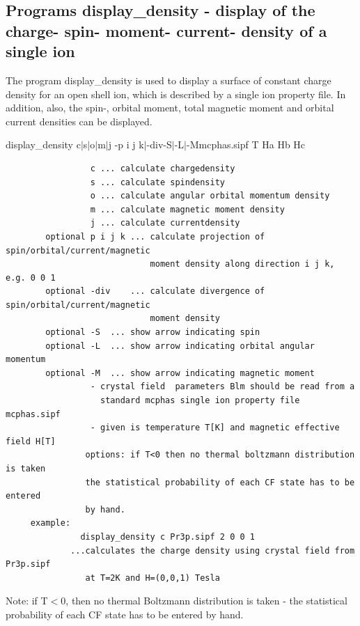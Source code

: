 \subsection{Programs {\prg display\_density} 
- display of the charge- spin- moment- current- density of a single ion}\label{displaydensity}

The program {\prg display\_density} is used to display a surface of constant
charge density for an open shell ion, which is described by a single ion property file.
In addition, also, the spin-, orbital moment, total magnetic moment and orbital current
densities can be displayed. 


\begin{description} 
\item [ display\_density  c$|$s$|$o$|$m$|$j \lbrack -p i j k$|$-div\rbrack \lbrack -S$|$-L$|$-M\rbrack mcphas.sipf
 T Ha Hb Hc]
\end{description} 
\begin{verbatim}
                 c ... calculate chargedensity
                 s ... calculate spindensity
                 o ... calculate angular orbital momentum density
                 m ... calculate magnetic moment density
                 j ... calculate currentdensity
        optional p i j k ... calculate projection of spin/orbital/current/magnetic 
                             moment density along direction i j k, e.g. 0 0 1
        optional -div    ... calculate divergence of spin/orbital/current/magnetic 
                             moment density
        optional -S  ... show arrow indicating spin
        optional -L  ... show arrow indicating orbital angular momentum
        optional -M  ... show arrow indicating magnetic moment
                 - crystal field  parameters Blm should be read from a
                   standard mcphas single ion property file mcphas.sipf
                 - given is temperature T[K] and magnetic effective field H[T]
                options: if T<0 then no thermal boltzmann distribution is taken
                the statistical probability of each CF state has to be entered
                by hand.
     example:
               display_density c Pr3p.sipf 2 0 0 1
             ...calculates the charge density using crystal field from Pr3p.sipf
                at T=2K and H=(0,0,1) Tesla
\end{verbatim}

Note: if T$<$0, then no thermal Boltzmann distribution is taken - 
		the statistical probability of each CF state has to be 
		entered by hand.

